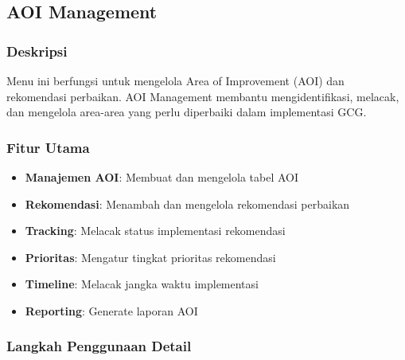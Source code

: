 \documentclass[12pt,a4paper]{article}
\begin{document}
\subsection{AOI Management}

\subsubsection{Deskripsi}
Menu ini berfungsi untuk mengelola Area of Improvement (AOI) dan rekomendasi perbaikan. AOI Management membantu mengidentifikasi, melacak, dan mengelola area-area yang perlu diperbaiki dalam implementasi GCG.

\subsubsection{Fitur Utama}
\begin{itemize}
\item \textbf{Manajemen AOI}: Membuat dan mengelola tabel AOI
\item \textbf{Rekomendasi}: Menambah dan mengelola rekomendasi perbaikan
\item \textbf{Tracking}: Melacak status implementasi rekomendasi
\item \textbf{Prioritas}: Mengatur tingkat prioritas rekomendasi
\item \textbf{Timeline}: Melacak jangka waktu implementasi
\item \textbf{Reporting}: Generate laporan AOI
\end{itemize}

\subsubsection{Langkah Penggunaan Detail}
\end{document}
